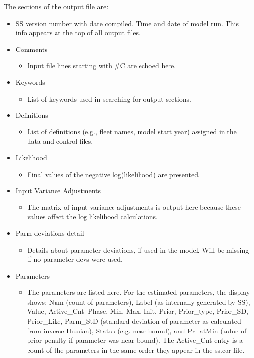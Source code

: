 The sections of the output file are:
\begin{itemize}
	\item SS version number with date compiled.  Time and date of model run.  This info appears at the top of all output files.
	\item Comments
		\begin{itemize}
			\item 	Input file lines starting with \#C are echoed here.
		\end{itemize}
	\item Keywords
		\begin{itemize}
			\item List of keywords used in searching for output sections.
		\end{itemize}
	\item Definitions
		\begin{itemize}
			\item List of definitions (e.g., fleet names, model start year) assigned in the data and control files.
		\end{itemize}
	\item Likelihood
		\begin{itemize}
			\item Final values of the negative log(likelihood) are presented.
		\end{itemize}
	\item Input Variance Adjustments
		\begin{itemize}
			\item The matrix of input variance adjustments is output here because these values affect the log likelihood calculations.
		\end{itemize}
	\item{Parm deviations detail}
	    \begin{itemize}
		    \item Details about parameter deviations, if used in the model. Will be missing if no parameter devs were used.
		\end{itemize}
	\item Parameters
		\begin{itemize}
			\item The parameters are listed here.  For the estimated parameters, the display shows: Num (count of parameters), Label (as internally generated by SS), Value, Active\_Cnt, Phase, Min, Max, Init, Prior, Prior\_type, Prior\_SD, Prior\_Like, Parm\_StD (standard deviation of parameter as calculated from inverse Hessian), Status (e.g. near bound), and Pr\_atMin (value of prior penalty if parameter was near bound).  The Active\_Cnt entry is a count of the parameters in the same order they appear in the ss.cor file.

\end{itemize}
\end{itemize}
